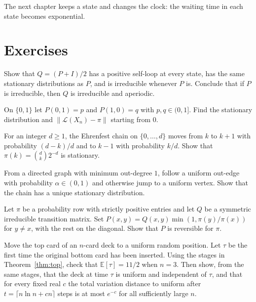 The next chapter keeps a state and changes the clock: the waiting time in each state becomes exponential.

\section{Exercises}

\begin{exercise}[$\star$]\label{ex:lazy}
Show that $Q=(P+I)/2$ has a positive self-loop at every state, has the same stationary distributions as $P$, and is irreducible whenever $P$ is. Conclude that if $P$ is irreducible, then $Q$ is irreducible and aperiodic.
\end{exercise}

\begin{exercise}[$\star$]\label{ex:twostate}
On $\{0,1\}$ let $P(0,1)=p$ and $P(1,0)=q$ with $p,q\in(0,1]$. Find the stationary distribution and $\|\mathcal L(X_n)-\pi\|$ starting from $0$.
\end{exercise}

\begin{exercise}[$\star\star$]\label{ex:ehrenfest}
For an integer $d\ge1$, the Ehrenfest chain on $\{0,\ldots,d\}$ moves from $k$ to $k+1$ with probability $(d-k)/d$ and to $k-1$ with probability $k/d$. Show that $\pi(k)=\binom{d}{k}2^{-d}$ is stationary.
\end{exercise}

\begin{exercise}[$\star\star$]\label{ex:pagerank}
From a directed graph with minimum out-degree $1$, follow a uniform out-edge with probability $\alpha\in(0,1)$ and otherwise jump to a uniform vertex. Show that the chain has a unique stationary distribution.
\end{exercise}

\begin{exercise}[$\star\star$]\label{ex:metropolis}
Let $\pi$ be a probability row with strictly positive entries and let $Q$ be a symmetric irreducible transition matrix. Set $P(x,y)=Q(x,y)\min(1,\pi(y)/\pi(x))$ for $y\ne x$, with the rest on the diagonal. Show that $P$ is reversible for $\pi$.
\end{exercise}

\begin{exercise}[$\star\star$]\label{ex:toptorandom}
Move the top card of an $n$-card deck to a uniform random position. Let $\tau$ be the first time the original bottom card has been inserted. Using the stages in Theorem~\ref{thm:top}, check that $\mathbb E[\tau]=11/2$ when $n=3$. Then show, from the same stages, that the deck at time $\tau$ is uniform and independent of $\tau$, and that for every fixed real $c$ the total variation distance to uniform after $t=\lceil n\ln n+cn\rceil$ steps is at most $e^{-c}$ for all sufficiently large $n$.
\end{exercise}

